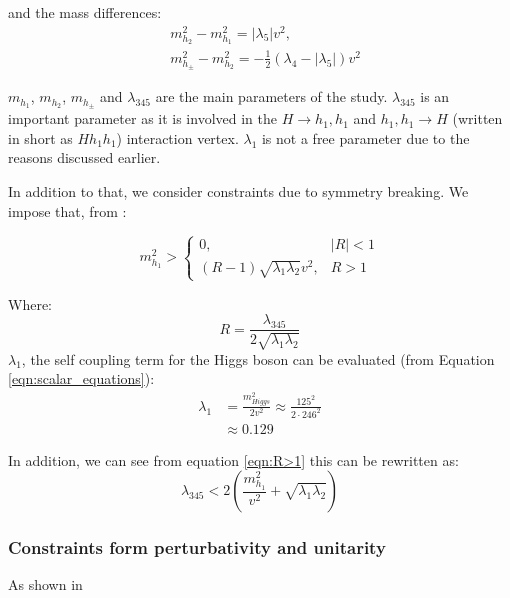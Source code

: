\documentclass[12pt]{article}
\begin{document}
and the mass differences: 
\begin{align}
    &m_{h_2}^2 - m_{h_1}^2 =  |\lambda_5|v^2, \\
    &m_{h_\pm}^2 - m_{h_2}^2 = -\frac{1}{2}(\lambda_4 - |\lambda_5|)v^2
\end{align}

$m_{h_1}$, $m_{h_2}$, $m_{h_\pm}$ and $\lambda_{345}$ are the main parameters of the study. $\lambda_{345}$ is an important parameter as it is involved in the $H\rightarrow h_1,h_1$ and $h_1,h_1 \rightarrow H$ (written in short as $Hh_1h_1$) interaction vertex. $\lambda_1$ is not a free parameter due to the reasons discussed earlier.

In addition to that, we consider constraints due to symmetry breaking. We impose that, from \cite{Belyaev:2016lok, Ginzburg2010}:

\begin{equation}
    m_{h_1}^2 >
        \begin{cases}
         0, & |R| < 1\\
         (R-1) \sqrt{\lambda_1\lambda_2} v^2, & R>1
        \end{cases}
\end{equation}

Where:
\begin{equation}
    R = \frac{\lambda_{345}}{2\sqrt{\lambda_1\lambda_2}}
\end{equation}
$\lambda_1$, the self coupling term for the Higgs boson can be evaluated (from Equation \ref{eqn:scalar_equations}):
\begin{equation}
    \begin{split}
        \lambda_1 &= \frac{m^2_{Higgs}}{2 v^2}
                \approx\frac{125^2}{2\cdot 246 ^ 2} \\
                &\approx0.129
    \end{split}
\end{equation}

In addition, we can see from equation \ref{eqn:R>1} this can be rewritten as:
\begin{equation}
    \lambda_{345} < 2\left( \frac{m_{h_1}^2}{v^2} + \sqrt{\lambda_1\lambda_2}\right)
\end{equation}

\subsubsection{Constraints form perturbativity and unitarity}
As shown in 
\end{document}
